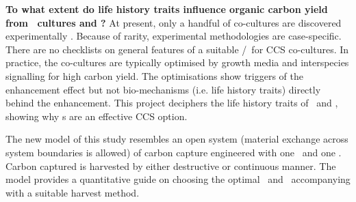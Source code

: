 \documentclass[../thesis.tex]{subfiles} %
\begin{document}
\textbf{To what extent do life history traits influence organic carbon yield from \phy\ cultures and \pbs?}  At present, only a handful of co-cultures are discovered experimentally \autocite{fuentes2016impact,santos2014microalgal}.  Because of rarity, experimental methodologies are case-specific.  There are no checklists on general features of a suitable \phy/\bacm\ for CCS co-cultures.  In practice, the co-cultures are typically optimised by growth media \autocite{aytekin2016statistical,fuentes2016impact} and interspecies signalling \autocite{fuentes2016impact} for high carbon yield.  The optimisations show triggers of the enhancement effect but not bio-mechanisms (i.e. life history traits) directly behind the enhancement.  This project deciphers the life history traits of \phy\ and \bac, showing why \pbs s are an effective CCS option.

The new model of this study resembles an open system (material exchange across system boundaries is allowed) of carbon capture engineered with one \phy\ and one \bacm.  Carbon captured is harvested by either destructive or continuous manner.  The model provides a quantitative guide on choosing the optimal \phy\ and \bac\ accompanying with a suitable harvest method.
\end{document}
